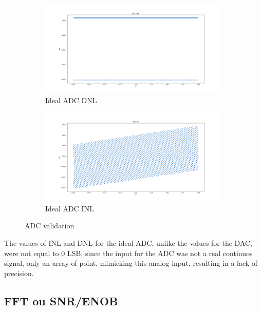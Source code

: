\begin{figure}[H]
    \begin{subfigure}[b]{0.5\textwidth}
        \centering
        \includegraphics[width=\textwidth]{Images/DNL_Ideal.png}
        \caption{Ideal ADC DNL}
        \label{fig:ADC_DNL_Ideal}
    \end{subfigure}%
    \begin{subfigure}[b]{0.5\textwidth}
        \centering
        \includegraphics[width=\textwidth]{Images/INL_Ideal.png}
        \caption{Ideal ADC INL}
        \label{fig:ADC_INL_Ideal}
    \end{subfigure}

    \caption{ADC validation}
    \label{fig:IdealADC}
\end{figure}

The values of INL and DNL for the ideal ADC, unlike the values for the DAC, were not equal to $0$ LSB, since the input for the ADC was not a real continuos signal, only an array of point, mimicking this analog input, resulting in a lack of precision.





\subsection{FFT ou SNR/ENOB}

